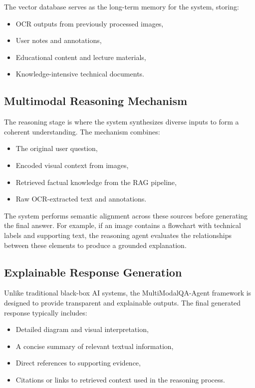 \documentclass[conference]{IEEEtran}
\begin{document}
The vector database serves as the long-term memory for the system, storing:
\begin{itemize}
    \item OCR outputs from previously processed images,
    \item User notes and annotations,
    \item Educational content and lecture materials,
    \item Knowledge-intensive technical documents.
\end{itemize}

\subsection{Multimodal Reasoning Mechanism}
The reasoning stage is where the system synthesizes diverse inputs to form a coherent understanding. The mechanism combines:
\begin{itemize}
    \item The original user question,
    \item Encoded visual context from images,
    \item Retrieved factual knowledge from the RAG pipeline,
    \item Raw OCR-extracted text and annotations.
\end{itemize}
The system performs semantic alignment across these sources before generating the final answer. For example, if an image contains a flowchart with technical labels and supporting text, the reasoning agent evaluates the relationships between these elements to produce a grounded explanation.

\subsection{Explainable Response Generation}
Unlike traditional black-box AI systems, the MultiModalQA-Agent framework is designed to provide transparent and explainable outputs. The final generated response typically includes:
\begin{itemize}
    \item Detailed diagram and visual interpretation,
    \item A concise summary of relevant textual information,
    \item Direct references to supporting evidence,
    \item Citations or links to retrieved context used in the reasoning process.
\end{itemize}
\end{document}
